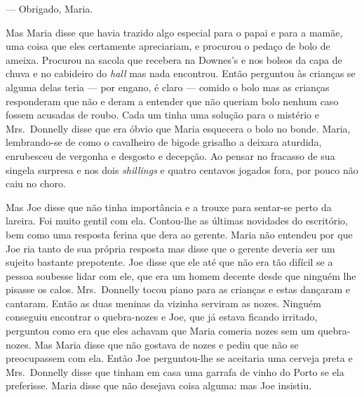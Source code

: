 --- Obrigado, Maria.

Mas Maria disse que havia trazido algo especial para o papai e para a mamãe,
uma coisa que eles certamente apreciariam, e procurou o pedaço de bolo de
ameixa.  Procurou na sacola que recebera na Downes’s e nos bolsos da capa de
chuva e no cabideiro do \textit{hall} mas nada encontrou.  Então perguntou às
crianças se alguma delas teria --- por engano, é claro --- comido o bolo
mas as crianças responderam que não e deram a entender que não queriam bolo
nenhum caso fossem acusadas de roubo.  Cada um tinha uma solução para o
mistério e Mrs.~Donnelly disse que era óbvio que Maria esquecera o bolo no
bonde.  Maria, lembrando-se de como o cavalheiro de bigode grisalho a deixara
aturdida, enrubesceu de vergonha e desgosto e decepção.  Ao pensar no fracasso
de sua singela surpresa e nos dois \textit{shillings} e quatro centavos jogados
fora, por pouco não caiu no choro.

Mas Joe disse que não tinha importância e a trouxe para sentar-se perto da
lareira.  Foi muito gentil com ela.  Contou-lhe as últimas novidades do
escritório, bem como uma resposta ferina que dera ao gerente.  Maria não
entendeu por que Joe ria tanto de sua própria resposta mas disse que o gerente
deveria ser um sujeito bastante prepotente.  Joe disse que ele até que não era
tão difícil se a pessoa soubesse lidar com ele, que era um homem decente desde
que ninguém lhe pisasse os calos.  Mrs.~Donnelly tocou piano para as crianças
e estas dançaram e cantaram.  Então as duas meninas da vizinha serviram as
nozes.  Ninguém conseguiu encontrar o quebra-nozes e Joe, que já estava ficando
irritado, perguntou como era que eles achavam que Maria comeria nozes sem um
quebra-nozes.  Mas Maria disse que não gostava de nozes e pediu que não se
preocupassem com ela.  Então Joe perguntou-lhe se aceitaria uma cerveja preta e
Mrs.~Donnelly disse que tinham em casa uma garrafa de vinho do Porto se ela
preferisse.  Maria disse que não desejava coisa alguma: mas Joe insistiu.

